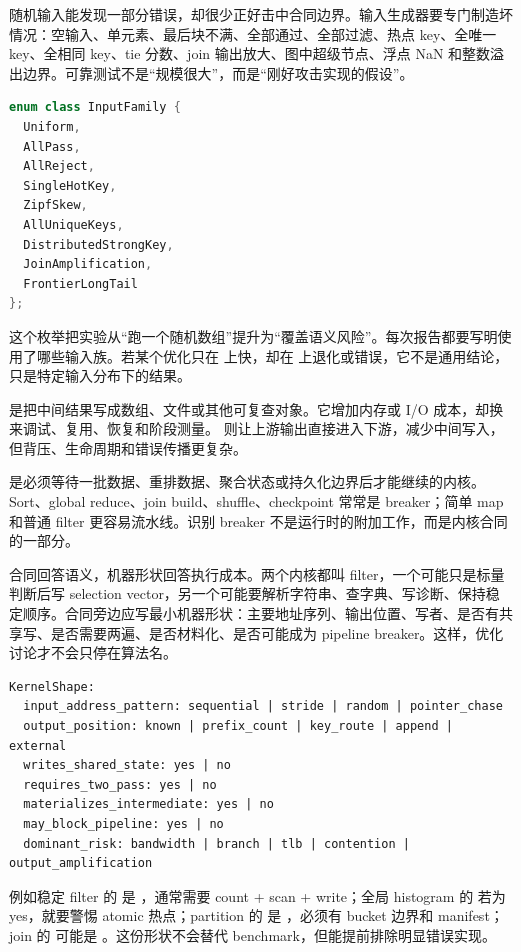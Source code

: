 随机输入能发现一部分错误，却很少正好击中合同边界。输入生成器要专门制造坏情况：空输入、单元素、最后块不满、全部通过、全部过滤、热点 key、全唯一 key、全相同 key、tie 分数、join 输出放大、图中超级节点、浮点 NaN 和整数溢出边界。可靠测试不是“规模很大”，而是“刚好攻击实现的假设”。

\begin{lstlisting}[language=C++,caption={压力输入族的接口形态}]
enum class InputFamily {
  Uniform,
  AllPass,
  AllReject,
  SingleHotKey,
  ZipfSkew,
  AllUniqueKeys,
  DistributedStrongKey,
  JoinAmplification,
  FrontierLongTail
};
\end{lstlisting}

这个枚举把实验从“跑一个随机数组”提升为“覆盖语义风险”。每次报告都要写明使用了哪些输入族。若某个优化只在  上快，却在  上退化或错误，它不是通用结论，只是特定输入分布下的结果。

 是把中间结果写成数组、文件或其他可复查对象。它增加内存或 I/O 成本，却换来调试、复用、恢复和阶段测量。 则让上游输出直接进入下游，减少中间写入，但背压、生命周期和错误传播更复杂。

 是必须等待一批数据、重排数据、聚合状态或持久化边界后才能继续的内核。Sort、global reduce、join build、shuffle、checkpoint 常常是 breaker；简单 map 和普通 filter 更容易流水线。识别 breaker 不是运行时的附加工作，而是内核合同的一部分。

合同回答语义，机器形状回答执行成本。两个内核都叫 filter，一个可能只是标量判断后写 selection vector，另一个可能要解析字符串、查字典、写诊断、保持稳定顺序。合同旁边应写最小机器形状：主要地址序列、输出位置、写者、是否有共享写、是否需要两遍、是否材料化、是否可能成为 pipeline breaker。这样，优化讨论才不会只停在算法名。

\begin{lstlisting}[numbers=none,caption={KernelShape 的抽象字段}]
KernelShape:
  input_address_pattern: sequential | stride | random | pointer_chase
  output_position: known | prefix_count | key_route | append | external
  writes_shared_state: yes | no
  requires_two_pass: yes | no
  materializes_intermediate: yes | no
  may_block_pipeline: yes | no
  dominant_risk: bandwidth | branch | tlb | contention | output_amplification
\end{lstlisting}

例如稳定 filter 的  是 ，通常需要 count + scan + write；全局 histogram 的  若为 yes，就要警惕 atomic 热点；partition 的  是 ，必须有 bucket 边界和 manifest；join 的  可能是 。这份形状不会替代 benchmark，但能提前排除明显错误实现。

